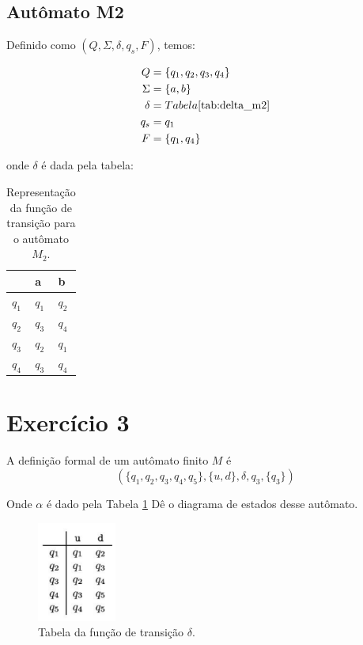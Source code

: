\documentclass[a4paper, 12pt]{article}
\begin{document}
\subsection{Autômato M2}
Definido como $(Q, \Sigma, \delta, q_s, F)$, temos:

\begin{align*}
    Q &= \{q_1, q_2, q_3, q_4\} \\
    \Sigma &= \{a, b\} \\
    \delta &= Tabela \text{\ref{tab:delta_m2}} \\
    q_s &= q_1 \\
    F &= \{q_1, q_4\}
\end{align*}

onde $\delta$ é dada pela tabela:

\begin{table}[!h]
    \centering
    \begin{tabular}{l|ll}
              & a     & b     \\ 
        \hline \hline
        $q_1$ & $q_1$ & $q_2$ \\
        $q_2$ & $q_3$ & $q_4$ \\
        $q_3$ & $q_2$ & $q_1$ \\
        $q_4$ & $q_3$ & $q_4$ \\
    \end{tabular}
    \caption{Representação da função de transição para o autômato $M_2$.}
    \label{tab:delta_m2}
\end{table}

\newpage
\section{Exercício 3}

A definição formal de um autômato finito $M$ é 
$$(\{q_1, q_2, q_3, q_4, q_5\}, \{u, d\}, \delta, q_3, \{q_3\})$$

Onde $\alpha$ é dado pela Tabela \ref{fig:table_delta} Dê o diagrama de estados desse autômato.

\begin{figure}[!ht]
    \centering
    \includegraphics[width=2.6cm]{./imgs/table_delta.png}
    \caption{Tabela da função de transição $\delta$.}
    \label{fig:table_delta}
\end{figure}
\end{document}
